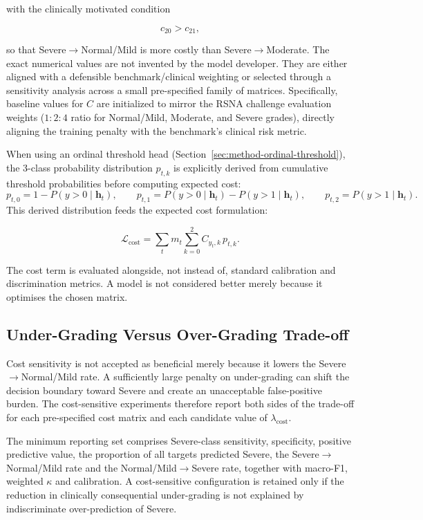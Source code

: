 with the clinically motivated condition

\[
c_{20}>c_{21},
\]

so that Severe$\rightarrow$Normal/Mild is more costly than
Severe$\rightarrow$Moderate. The exact numerical values are not invented by the
model developer. They are either aligned with a defensible benchmark/clinical
weighting or selected through a sensitivity analysis across a small
pre-specified family of matrices. Specifically, baseline values for $C$ are
initialized to mirror the RSNA challenge evaluation weights ($1:2:4$ ratio for
Normal/Mild, Moderate, and Severe grades), directly aligning the training penalty
with the benchmark's clinical risk metric.

When using an ordinal threshold head (Section~\ref{sec:method-ordinal-threshold}), the 3-class probability distribution $p_{t,k}$ is explicitly derived from cumulative threshold probabilities before computing expected cost:
\[
p_{t,0} = 1 - P(y>0\mid\mathbf{h}_t), \qquad
p_{t,1} = P(y>0\mid\mathbf{h}_t) - P(y>1\mid\mathbf{h}_t), \qquad
p_{t,2} = P(y>1\mid\mathbf{h}_t).
\]
This derived distribution feeds the expected cost formulation:

\begin{equation}
\mathcal{L}_{\mathrm{cost}}
=
\sum_t m_t
\sum_{k=0}^{2}
C_{y_t,k}\,p_{t,k}.
\label{eq:expected-cost}
\end{equation}

The cost term is evaluated alongside, not instead of, standard calibration and
discrimination metrics. A model is not considered better merely because it
optimises the chosen matrix.

\subsection{Under-Grading Versus Over-Grading Trade-off}
\label{sec:method-cost-tradeoff}

Cost sensitivity is not accepted as beneficial merely because it lowers the
Severe$\rightarrow$Normal/Mild rate. A sufficiently large penalty on
under-grading can shift the decision boundary toward Severe and create an
unacceptable false-positive burden. The cost-sensitive experiments therefore
report both sides of the trade-off for each pre-specified cost matrix and each
candidate value of $\lambda_{\mathrm{cost}}$.

The minimum reporting set comprises Severe-class sensitivity, specificity,
positive predictive value, the proportion of all targets predicted Severe, the
Severe$\rightarrow$Normal/Mild rate and the Normal/Mild$\rightarrow$Severe rate,
together with macro-F1, weighted $\kappa$ and calibration. A cost-sensitive
configuration is retained only if the reduction in clinically consequential
under-grading is not explained by indiscriminate over-prediction of Severe.

